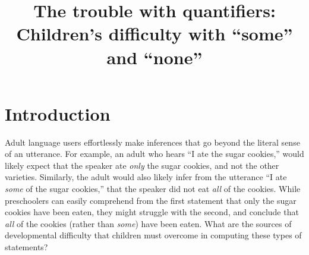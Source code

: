 \documentclass[man]{apa2}
\title{The trouble with quantifiers: Children's difficulty with ``some'' and ``none''}
\begin{document}
\maketitle               

\section{Introduction}


Adult language users effortlessly make inferences that go beyond the literal sense of an utterance. For example, an adult who hears ``I ate the sugar cookies,'' would likely expect that the speaker ate \emph{only} the sugar cookies, and not the other varieties. Similarly, the adult would also likely infer from the utterance ``I ate \emph{some} of the sugar cookies,'' that the speaker did not eat \emph{all} of the cookies. While preschoolers can easily comprehend from the first statement that only the sugar cookies have been eaten, they might struggle with the second, and conclude that \emph{all} of the cookies (rather than \emph{some}) have been eaten. What are the sources of developmental difficulty that children must overcome in computing these types of statements?
\end{document}
